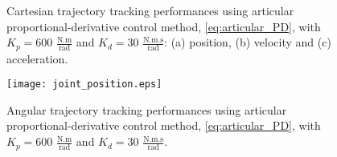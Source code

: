 \vspace*{0cm}
\begin{figure}
	\centering
	\hfill
	\hfill
	\caption{Cartesian trajectory tracking performances using  articular proportional-derivative control method, \eqref{eq:articular_PD}, with  ${K_{p}}=600$ $\mathrm{\frac{N.m}{rad}}$ and $K_{d}= 30$ $\mathrm{\frac{N.m.s}{rad}}$: (a) position, (b) velocity and (c) acceleration.}
	\label{fig:act_1.3_ee_position}
\end{figure}

\begin{figure}
    \centering
    \texttt{[image: joint\_position.eps]}
    \caption{Angular trajectory tracking performances using articular proportional-derivative control method, \eqref{eq:articular_PD}, with  ${K_{p}}=600$ $\mathrm{\frac{N.m}{rad}}$ and $K_{d}= 30$ $\mathrm{\frac{N.m.s}{rad}}$.}
    \label{fig:act_1.3_joint_position}
\end{figure}
